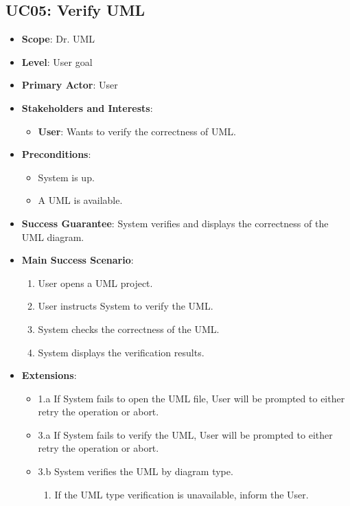 \documentclass[12pt]{article}
\begin{document}
\subsection{UC05: Verify UML}
\begin{itemize}
    \item \textbf{Scope}: Dr. UML
    \item \textbf{Level}: User goal
    \item \textbf{Primary Actor}: User
    \item \textbf{Stakeholders and Interests}:
    \begin{itemize}
        \item \textbf{User}: Wants to verify the correctness of UML.
    \end{itemize}
    \item \textbf{Preconditions}:
    \begin{itemize}
        \item System is up.
        \item A UML is available.
    \end{itemize}
    \item \textbf{Success Guarantee}: System verifies and displays the correctness of the UML diagram.
    \item \textbf{Main Success Scenario}:
    \begin{enumerate}
        \item User opens a UML project.
        \item User instructs System to verify the UML.
        \item System checks the correctness of the UML.
        \item System displays the verification results.
    \end{enumerate}
    \item \textbf{Extensions}:
    \begin{itemize}
        \item 1.a If System fails to open the UML file, User will be prompted to either retry the operation or abort.
        \item 3.a If System fails to verify the UML, User will be prompted to either retry the operation or abort.
        \item 3.b System verifies the UML by diagram type.
        \begin{enumerate}
            \item If the UML type verification is unavailable, inform the User.
        \end{enumerate}

\end{itemize}
\end{itemize}
\end{document}
